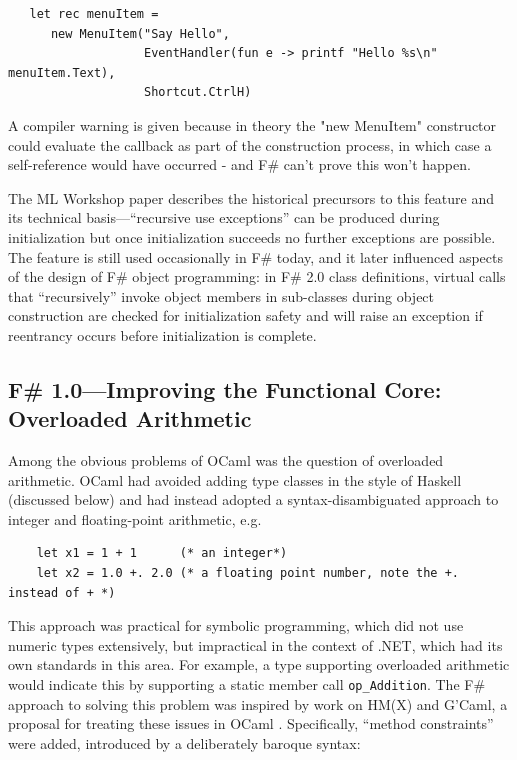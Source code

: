 \documentclass[acmsmall,screen]{acmart}
\begin{document}
\begin{verbatim}
   let rec menuItem = 
      new MenuItem("Say Hello", 
                   EventHandler(fun e -> printf "Hello %s\n" menuItem.Text), 
                   Shortcut.CtrlH)
\end{verbatim}
\begin{verbquote}
A compiler warning is given because in theory the "new MenuItem" constructor could evaluate the callback as part of the construction process, in which case a self-reference would have occurred - and F# can't prove this won't happen. 
\end{verbquote}
The ML Workshop paper describes the historical precursors to this feature and its technical basis---“recursive use exceptions” can be produced during
initialization but once initialization succeeds no further exceptions are possible. The feature is still used occasionally in F\# today, and it later influenced
aspects of the design of F\# object programming: in F\# 2.0 class definitions, virtual calls that “recursively” invoke object members in sub-classes during
object construction are checked for initialization safety and will raise an exception if reentrancy occurs before initialization is complete. 


\subsection*{F\# 1.0---Improving the Functional Core: Overloaded Arithmetic}

Among the obvious problems of OCaml was the question of overloaded arithmetic.  OCaml had avoided adding type classes in the style of Haskell (discussed below) and had instead adopted a syntax-disambiguated approach to integer and floating-point arithmetic, e.g.

\begin{verbatim}
    let x1 = 1 + 1      (* an integer*)
    let x2 = 1.0 +. 2.0 (* a floating point number, note the +. instead of + *)
\end{verbatim}

This approach was practical for symbolic programming, which did not use numeric types extensively, but impractical in the context of .NET, which had its own
standards in this area. For example, a type supporting overloaded arithmetic would indicate this by supporting a static member call \texttt{op\_Addition}.
The F\# approach to solving this problem was inspired by work on HM(X) and G'Caml, a proposal for treating these issues in OCaml \citep{Furuse2002}.
Specifically, “method constraints” were added, introduced by a deliberately baroque syntax:
\end{document}
